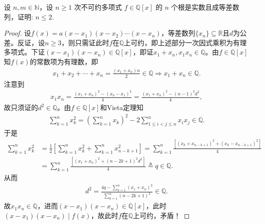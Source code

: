 \documentclass[../../main.tex]{subfiles}%
\begin{document}
\begin{example}
设 \( n,m \in \mathbb{N} \)，设 \( n \geqslant 1 \) 次不可约多项式 \( f \in \mathbb{Q}[x] \) 的 \( n \) 个根是实数且成等差数列，证明: \( n \leqslant 2 \).
\end{example}
\begin{proof}

设$f(x)=a(x-x_1)(x-x_2)\cdots(x-x_n)$，等差数列$\{x_n\}\subseteq\mathbb{R}$且$d$为公差。反证，设$n\geqslant 3$，则只需证此时$f$在$\mathbb{Q}$上可约，即上述部分一次因式乘积为有理多项式。下证$(x-x_1)(x-x_n)\in\mathbb{Q}[x]$，即证$x_1+x_n,x_1x_n\in\mathbb{Q}$。由$f\in\mathbb{Q}[x]$知$f(x)$的常数项为有理数，即
\begin{align*}
x_1+x_2+\cdots+x_n=\frac{(x_1+x_n)n}{2}\in\mathbb{Q}\Longrightarrow x_1+x_n\in\mathbb{Q}.
\end{align*}
注意到
\begin{align*}
x_1x_n=\frac{(x_1+x_n)^2-(x_n-x_1)^2}{4}=\frac{(x_1+x_n)^2-(n-1)^2d^2}{4},
\end{align*}
故只须证的$d^2\in\mathbb{Q}$。由$f\in\mathbb{Q}[x]$和Vieta定理知
\begin{align*}
\sum_{k=1}^n x_k^2=\left(\sum_{k=1}^n x_k\right)^2-2\sum_{1\leqslant i<j\leqslant n}^n x_ix_j\in\mathbb{Q}.
\end{align*}
于是
\begin{align*}
\sum_{k=1}^n x_k^2&=\frac{1}{2}\left[\sum_{k=1}^n x_k^2+\sum_{k=1}^n x_{n-k+1}^2\right]=\sum_{k=1}^n \frac{\left[(x_k+x_{n-k+1})^2+(x_k-x_{n-k+1})^2\right]}{4}\\
&=\sum_{k=1}^n \frac{\left[(x_1+x_n)^2+(n-2k+1)^2d^2\right]}{4}\triangleq q\in\mathbb{Q}.
\end{align*}
从而
\begin{align*}
d^2=\frac{4q-\sum\limits_{k=1}^n (x_1+x_n)^2}{\sum\limits_{k=1}^n (n-2k+1)^2}\in\mathbb{Q}.
\end{align*}
故$x_1x_n\in\mathbb{Q}$，进而$(x-x_1)(x-x_n)\in\mathbb{Q}[x]$，此时$(x-x_1)(x-x_n)\mid f(x)$，故此时$f$在$\mathbb{Q}$上可约，矛盾！

\end{proof}
\end{document}
